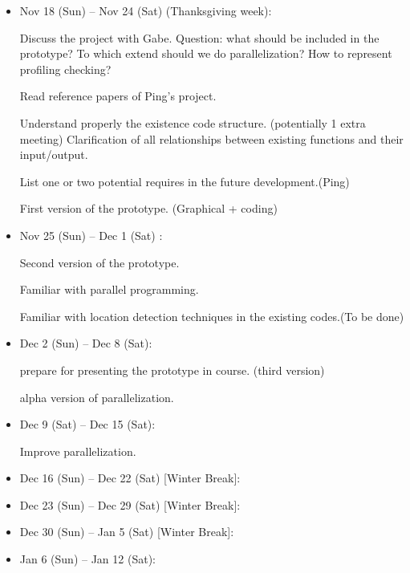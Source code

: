 \documentclass[a4paper,12pt]{article}
\theoremstyle{remark}
\numberwithin{equation}{section}
\begin{document}
	\begin{itemize}
		\item Nov 18 (Sun) -- Nov 24 (Sat) (Thanksgiving week):  
		
		Discuss the project with Gabe. Question: what should be included in the prototype? To which extend should we do parallelization? How to represent profiling checking?  
		
		Read reference papers of Ping's project.
		
		Understand properly the existence code structure. (potentially 1 extra meeting) 
		Clarification of all relationships between existing functions and their input/output. 
		
		List one or two potential requires in the future development.(Ping)
		
		First version of the prototype. (Graphical + coding)
		
		
		\item Nov 25 (Sun) -- Dec 1 (Sat) : 
		  
		Second version of the prototype. 
		
		Familiar with parallel programming.
		
		Familiar with location detection techniques in the existing codes.(To be done) 
		
		\item Dec 2 (Sun) -- Dec 8 (Sat): 
		
		prepare for presenting the prototype in course. (third version)
		
		alpha version of parallelization.
		
		\item Dec 9 (Sat) -- Dec 15 (Sat):
		
		Improve parallelization. 
		
		\item Dec 16 (Sun) -- Dec 22 (Sat) [Winter Break]:
		\item Dec 23 (Sun) -- Dec 29 (Sat) [Winter Break]:
		\item Dec 30 (Sun) -- Jan 5  (Sat) [Winter Break]:
		\item Jan 6 (Sun) -- Jan 12 (Sat):
		
		
		
		 
		
	\end{itemize}
	


	
	{}
	
\end{document}
